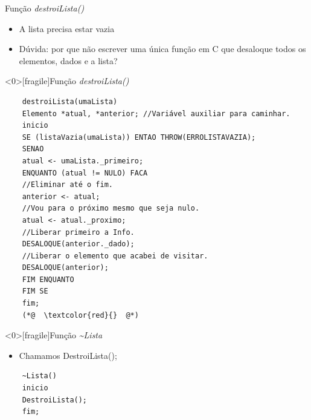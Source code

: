 \documentclass[12pt,table,xcolor={dvipsnames}]{beamer}
\begin{document}
\begin{frame}[fragile]{Função \textit{destroiLista()}}
	\begin{itemize}
		\item A lista precisa estar vazia
		\item Dúvida: por que não escrever uma única função em C que desaloque todos os elementos, dados e a lista?
	\end{itemize}
\end{frame}


\begin{frame}<0>[fragile]{Função \textit{destroiLista()}}
	\begin{lstlisting}
	destroiLista(umaLista)
	Elemento *atual, *anterior; //Variável auxiliar para caminhar.
	inicio
	SE (listaVazia(umaLista)) ENTAO THROW(ERROLISTAVAZIA);
	SENAO
	atual <- umaLista._primeiro;    
	ENQUANTO (atual != NULO) FACA 
	//Eliminar até o fim.
	anterior <- atual;
	//Vou para o próximo mesmo que seja nulo.
	atual <- atual._proximo;
	//Liberar primeiro a Info.
	DESALOQUE(anterior._dado);
	//Liberar o elemento que acabei de visitar.
	DESALOQUE(anterior);
	FIM ENQUANTO
	FIM SE
	fim;
	(*@  \textcolor{red}{}  @*)
	\end{lstlisting}
\end{frame}


\begin{frame}<0>[fragile]{Função \textit{\~{}Lista}}
	
	\begin{itemize}
		\item Chamamos DestroiLista();
	\end{itemize}
	\begin{lstlisting}
	~Lista()
	inicio
	DestroiLista();
	fim;
	\end{lstlisting}
\end{frame}
\end{document}
